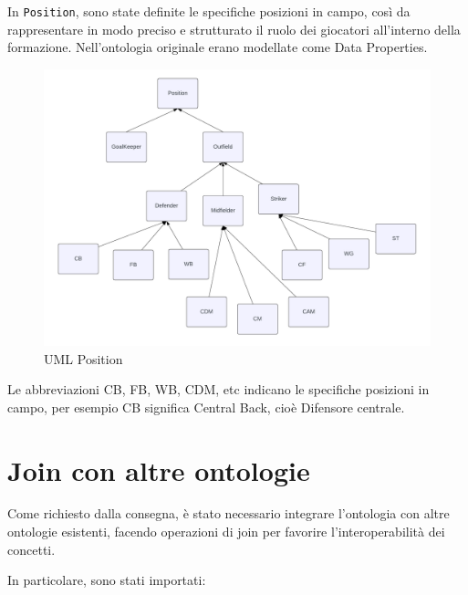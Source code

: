 \documentclass[11pt]{report} %
\begin{document}
\begin{itemize}
      In \texttt{Position}, sono state definite le  specifiche posizioni in campo, così da rappresentare in modo preciso e strutturato il ruolo dei giocatori all'interno della formazione. Nell'ontologia originale erano modellate come Data Properties.
     \begin{figure}[H]
         \centering
         \includegraphics[width=1\linewidth]{POSITION.png}
         \caption{UML Position}
         \label{fig:enter-label}
     \end{figure}
    \hspace{2cm}

    Le abbreviazioni CB, FB, WB, CDM, etc indicano le specifiche posizioni in campo, per esempio CB significa Central Back, cioè Difensore centrale.
 \end{itemize}
\newpage

\section{Join con altre ontologie}

Come richiesto dalla consegna, è stato necessario integrare l'ontologia con altre ontologie esistenti, facendo operazioni di join per favorire l'interoperabilità dei concetti.

In particolare, sono stati importati:
\end{document}
